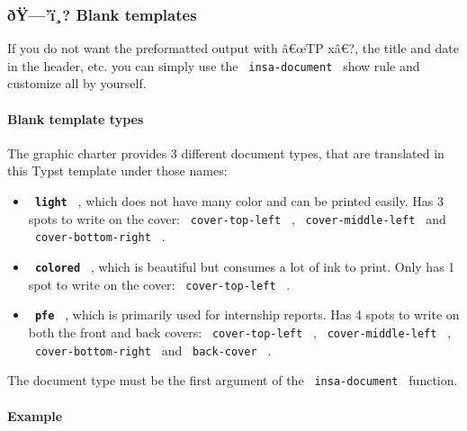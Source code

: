 \subsubsection{ðŸ---'ï¸? Blank
templates}\label{uxf0uxffuxef-blank-templates}


If you do not want the preformatted output with â€œTP xâ€?, the title
and date in the header, etc. you can simply use the
\texttt{\ insa-document\ } show rule and customize all by yourself.

\paragraph{Blank template types}\label{blank-template-types}

The graphic charter provides 3 different document types, that are
translated in this Typst template under those names:

\begin{itemize}
\tightlist
\item
  \textbf{\texttt{\ light\ }} , which does not have many color and can
  be printed easily. Has 3 spots to write on the cover:
  \texttt{\ cover-top-left\ } , \texttt{\ cover-middle-left\ } and
  \texttt{\ cover-bottom-right\ } .
\item
  \textbf{\texttt{\ colored\ }} , which is beautiful but consumes a lot
  of ink to print. Only has 1 spot to write on the cover:
  \texttt{\ cover-top-left\ } .
\item
  \textbf{\texttt{\ pfe\ }} , which is primarily used for internship
  reports. Has 4 spots to write on both the front and back covers:
  \texttt{\ cover-top-left\ } , \texttt{\ cover-middle-left\ } ,
  \texttt{\ cover-bottom-right\ } and \texttt{\ back-cover\ } .
\end{itemize}

The document type must be the first argument of the
\texttt{\ insa-document\ } function.

\paragraph{Example}\label{example-2}

\begin{Shaded}
\begin{Highlighting}[]
\NormalTok{  cover{-}middle{-}left: [}

\NormalTok{  ],}
\NormalTok{)}
\end{Highlighting}
\end{Shaded}

